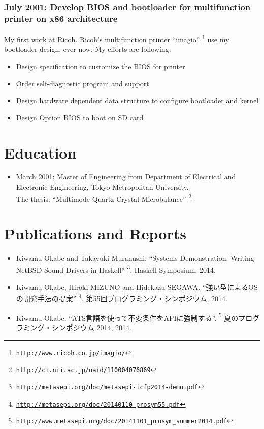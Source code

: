\documentclass[letterpaper]{article}
\begin{document}
\subsubsection*{July 2001: Develop BIOS and bootloader for multifunction printer on x86 architecture}
My first work at Ricoh.
Ricoh's multifunction printer ``imagio''
\footnote{\href{http://www.ricoh.co.jp/imagio/}{\tt http://www.ricoh.co.jp/imagio/}}
use my bootloader design, ever now.
My efforts are following.
\begin{itemize}
  \item Design specification to customize the BIOS for printer
  \item Order self-diagnostic program and support
  \item Design hardware dependent data structure to configure bootloader and kernel
  \item Design Option BIOS to boot on SD card
\end{itemize}

\section*{Education}

\begin{itemize}
  \item March 2001: Master of Engineering from Department of Electrical and Electronic Engineering, Tokyo Metropolitan University. \\
    The thesis: ``Multimode Quartz Crystal Microbalance''
    \footnote{\href{http://ci.nii.ac.jp/naid/110004076869}{\tt http://ci.nii.ac.jp/naid/110004076869}}
\end{itemize}

\section*{Publications and Reports}

\begin{itemize}
  \item Kiwamu Okabe and Takayuki Muranushi. ``Systems Demonstration: Writing NetBSD Sound Drivers in Haskell'' \footnote{\href{http://metasepi.org/doc/metasepi-icfp2014-demo.pdf}{\tt http://metasepi.org/doc/metasepi-icfp2014-demo.pdf}}. Haskell Symposium, 2014.
  \item Kiwamu Okabe, Hiroki MIZUNO and Hidekazu SEGAWA. ``強い型によるOSの開発手法の提案'' \footnote{\href{http://metasepi.org/doc/20140110\_prosym55.pdf}{\tt http://metasepi.org/doc/20140110\_prosym55.pdf}}. 第55回プログラミング・シンポジウム, 2014.
  \item Kiwamu Okabe. ``ATS言語を使って不変条件をAPIに強制する''. \footnote{\href{http://www.metasepi.org/doc/20141101\_prosym\_summer2014.pdf}{\tt http://www.metasepi.org/doc/20141101\_prosym\_summer2014.pdf}} 夏のプログラミング・シンポジウム 2014, 2014.
\end{itemize}
\end{document}
